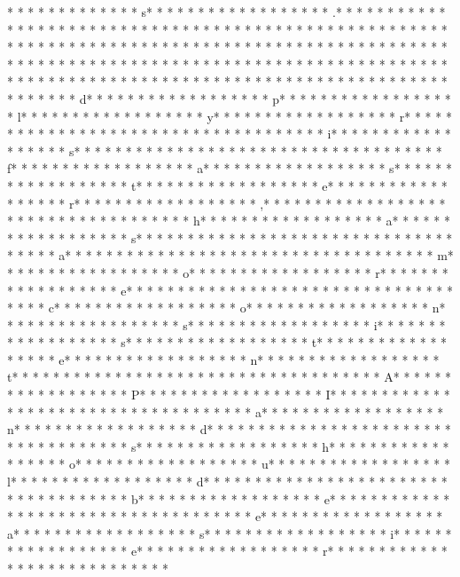 *  * * *  *  * * *  *  * * *  * s* * *  * * *  * * *  *  * * *  *  * * *  * .* * *  * * *  * * *  *  * * *  *  * * *  *  * * *  * * *  * * *  *  * * *  *  * * *  * * *  * * *  *  * * *  *  * * *  * * *  * * *  *  * * *  *  * * *  *  * * *  * * *  * * *  *  * * *  *  * * *  *  * * *  * * *  * * *  *  * * *  *  * * *  *  * * *  * * *  * * *  *  * * *  *  * * *  *  * * *  * * *  * * *  *  * * *  *  * * *  *  * * *  * * *  * * *  *  * * *  *  * * *  *  * * *  * * *  * * *  *  * * *  *  * * *  *  * * *  * * *  * * *  *  * * *  *  * * *  * d* * *  * * *  * * *  *  * * *  *  * * *  * p* * *  * * *  * * *  *  * * *  *  * * *  * l* * *  * * *  * * *  *  * * *  *  * * *  * y* * *  * * *  * * *  *  * * *  *  * * *  * r* * *  * * *  * * *  *  * * *  *  * * *  *  * * *  * * *  * * *  *  * * *  *  * * *  * i* * *  * * *  * * *  *  * * *  *  * * *  * s* * *  * * *  * * *  *  * * *  *  * * *  *  * * *  * * *  * * *  *  * * *  *  * * *  * f* * *  * * *  * * *  *  * * *  *  * * *  * a* * *  * * *  * * *  *  * * *  *  * * *  * s* * *  * * *  * * *  *  * * *  *  * * *  * t* * *  * * *  * * *  *  * * *  *  * * *  * e* * *  * * *  * * *  *  * * *  *  * * *  * r* * *  * * *  * * *  *  * * *  *  * * *  * ,* * *  * * *  * * *  *  * * *  *  * * *  *  * * *  * * *  * * *  *  * * *  *  * * *  * h* * *  * * *  * * *  *  * * *  *  * * *  * a* * *  * * *  * * *  *  * * *  *  * * *  * s* * *  * * *  * * *  *  * * *  *  * * *  *  * * *  * * *  * * *  *  * * *  *  * * *  * a* * *  * * *  * * *  *  * * *  *  * * *  *  * * *  * * *  * * *  *  * * *  *  * * *  * m* * *  * * *  * * *  *  * * *  *  * * *  * o* * *  * * *  * * *  *  * * *  *  * * *  * r* * *  * * *  * * *  *  * * *  *  * * *  * e* * *  * * *  * * *  *  * * *  *  * * *  *  * * *  * * *  * * *  *  * * *  *  * * *  * c* * *  * * *  * * *  *  * * *  *  * * *  * o* * *  * * *  * * *  *  * * *  *  * * *  * n* * *  * * *  * * *  *  * * *  *  * * *  * s* * *  * * *  * * *  *  * * *  *  * * *  * i* * *  * * *  * * *  *  * * *  *  * * *  * s* * *  * * *  * * *  *  * * *  *  * * *  * t* * *  * * *  * * *  *  * * *  *  * * *  * e* * *  * * *  * * *  *  * * *  *  * * *  * n* * *  * * *  * * *  *  * * *  *  * * *  * t* * *  * * *  * * *  *  * * *  *  * * *  *  * * *  * * *  * * *  *  * * *  *  * * *  * A* * *  * * *  * * *  *  * * *  *  * * *  * P* * *  * * *  * * *  *  * * *  *  * * *  * I* * *  * * *  * * *  *  * * *  *  * * *  *  * * *  * * *  * * *  *  * * *  *  * * *  * a* * *  * * *  * * *  *  * * *  *  * * *  * n* * *  * * *  * * *  *  * * *  *  * * *  * d* * *  * * *  * * *  *  * * *  *  * * *  *  * * *  * * *  * * *  *  * * *  *  * * *  * s* * *  * * *  * * *  *  * * *  *  * * *  * h* * *  * * *  * * *  *  * * *  *  * * *  * o* * *  * * *  * * *  *  * * *  *  * * *  * u* * *  * * *  * * *  *  * * *  *  * * *  * l* * *  * * *  * * *  *  * * *  *  * * *  * d* * *  * * *  * * *  *  * * *  *  * * *  *  * * *  * * *  * * *  *  * * *  *  * * *  * b* * *  * * *  * * *  *  * * *  *  * * *  * e* * *  * * *  * * *  *  * * *  *  * * *  *  * * *  * * *  * * *  *  * * *  *  * * *  * e* * *  * * *  * * *  *  * * *  *  * * *  * a* * *  * * *  * * *  *  * * *  *  * * *  * s* * *  * * *  * * *  *  * * *  *  * * *  * i* * *  * * *  * * *  *  * * *  *  * * *  * e* * *  * * *  * * *  *  * * *  *  * * *  * r* * *  * * *  * * *  *  * * *  *  * * *  *  * * *  * * *  * * *  * 